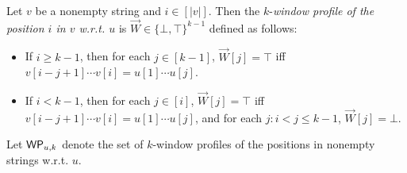 %
%
%


\begin{definition}
Let $v$ be a nonempty string and $i \in [|v|]$. Then the $k$-\emph{window profile of the position $i$ in $v$ w.r.t. $u$} is $\overrightarrow{W}  \in \{\bot,\top\}^{k-1}$ defined as follows: 
\begin{itemize}
\item If $i \ge k-1$, then for each $j \in [k-1]$, $\overrightarrow{W}[j] = \top$ iff $v[i-j+1] \cdots v[i]=u[1] \cdots u[j]$. 
%
\item If $i < k-1$, then for each $j \in [i]$, $\overrightarrow{W}[j] = \top$ iff $v[i-j+1] \cdots v[i]=u[1] \cdots u[j]$, and for each $j: i < j \le k-1$, $\overrightarrow{W}[j] = \bot$. 
\end{itemize}
Let $\mathsf{WP}_{u, k}$ denote the set of $k$-window profiles of the positions in nonempty strings w.r.t. $u$. 
\end{definition}


